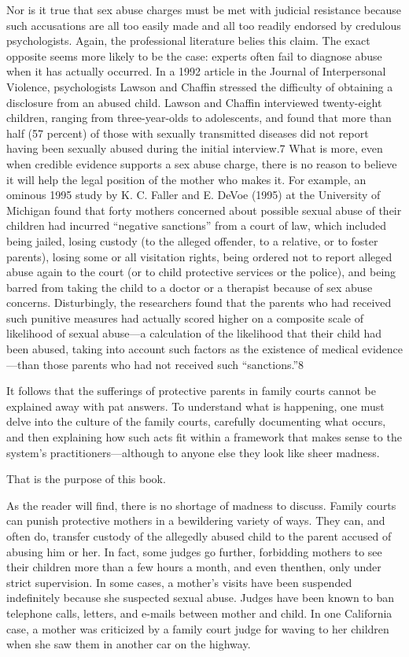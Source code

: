 Nor is it true that sex abuse charges must be met with judicial resistance because such accusations are all too easily made and all too readily endorsed by credulous psychologists. Again, the professional literature belies this claim. The exact opposite seems more likely to be the case: experts often fail to diagnose abuse when it has actually occurred. In a 1992 article in the Journal of Interpersonal Violence, psychologists Lawson and Chaffin stressed the difficulty of obtaining a disclosure from an abused child. Lawson and Chaffin interviewed twenty-eight children, ranging from three-year-olds to adolescents, and found that more than half (57 percent) of those with sexually transmitted diseases did not report having been sexually abused during the initial interview.7 What is more, even when credible evidence supports a sex abuse charge, there is no reason to believe it will help the legal position of the mother who makes it. For example, an ominous 1995 study by K. C. Faller and E. DeVoe (1995) at the University of Michigan found that forty mothers concerned about possible sexual abuse of their children had incurred “negative sanctions” from a court of law, which included being jailed, losing custody (to the alleged offender, to a relative, or to foster parents), losing some or all visitation rights, being ordered not to report alleged abuse again to the court (or to child protective services or the police), and being barred from taking the child to a doctor or a therapist because of sex abuse concerns. Disturbingly, the researchers found that the parents who had received such punitive measures had actually scored higher on a composite scale of likelihood of sexual abuse—a calculation of the likelihood that their child had been abused, taking into account such factors as the existence of medical evidence—than those parents who had not received such “sanctions.”8 \pfl{}


It follows that the sufferings of protective parents in family courts cannot be explained away with pat answers. To understand what is happening, one must delve into the culture of the family courts, carefully documenting what occurs, and then explaining how such acts fit within a framework that makes sense to the system’s practitioners—although to anyone else they look like sheer madness. \pfl{}


That is the purpose of this book. \pfl{}


As the reader will find, there is no shortage of madness to discuss. Family courts can punish protective mothers in a bewildering variety of ways. They can, and often do, transfer custody of the allegedly abused child to the parent accused of abusing him or her. In fact, some judges go further, forbidding mothers to see their children more than a few hours a month, and even thenthen, only under strict supervision. In some cases, a mother’s visits have been suspended indefinitely because she suspected sexual abuse. Judges have been known to ban telephone calls, letters, and e-mails between mother and child. In one California case, a mother was criticized by a family court judge for waving to her children when she saw them in another car on the highway. \pfl{}


